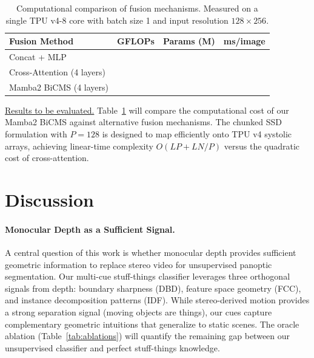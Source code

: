 \documentclass{article}
\begin{document}
\begin{table}[t]
\centering
\caption{Computational comparison of fusion mechanisms. Measured on a single TPU v4-8 core with batch size 1 and input resolution $128 \times 256$.}
\label{tab:compute}
\begin{tabular}{lccc}
\toprule
\textbf{Fusion Method} & \textbf{GFLOPs} & \textbf{Params (M)} & \textbf{ms/image} \\
\midrule
Concat + MLP & \underline{\hspace{2em}} & \underline{\hspace{2em}} & \underline{\hspace{2em}} \\
Cross-Attention (4 layers) & \underline{\hspace{2em}} & \underline{\hspace{2em}} & \underline{\hspace{2em}} \\
Mamba2 BiCMS (4 layers) & \underline{\hspace{2em}} & \underline{\hspace{2em}} & \underline{\hspace{2em}} \\
\bottomrule
\end{tabular}
\end{table}

\underline{Results to be evaluated.} Table~\ref{tab:compute} will compare the computational cost of our Mamba2 BiCMS against alternative fusion mechanisms. The chunked SSD formulation with $P = 128$ is designed to map efficiently onto TPU v4 systolic arrays, achieving linear-time complexity $O(LP + LN/P)$ versus the quadratic cost of cross-attention.


\section{Discussion}
\label{sec:discussion}

\paragraph{Monocular Depth as a Sufficient Signal.}
A central question of this work is whether monocular depth provides sufficient geometric information to replace stereo video for unsupervised panoptic segmentation. Our multi-cue stuff-things classifier leverages three orthogonal signals from depth: boundary sharpness (DBD), feature space geometry (FCC), and instance decomposition patterns (IDF). While stereo-derived motion provides a strong separation signal (moving objects are things), our cues capture complementary geometric intuitions that generalize to static scenes. The oracle ablation (Table~\ref{tab:ablations}) will quantify the remaining gap between our unsupervised classifier and perfect stuff-things knowledge.
\end{document}
